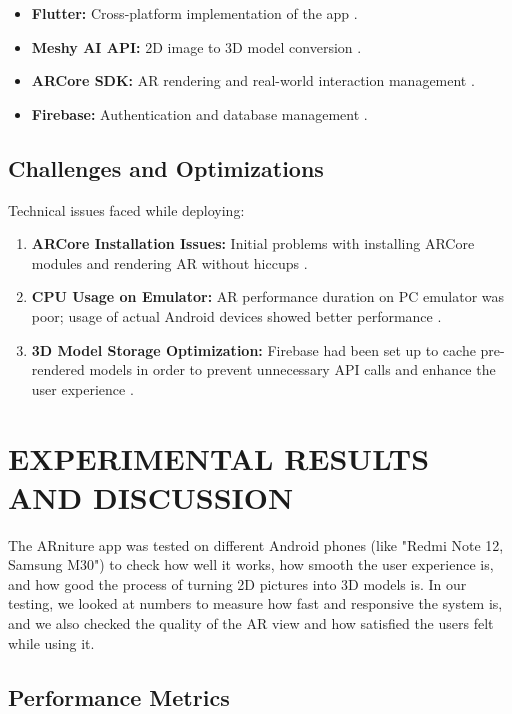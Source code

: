 \documentclass[12pt, a4paper]{article}
\begin{document}
\begin{itemize}
    \item \textbf{Flutter:} Cross-platform implementation of the app \cite{ref4}.
    \item \textbf{Meshy AI API:} 2D image to 3D model conversion \cite{ref2}.
    \item \textbf{ARCore SDK:} AR rendering and real-world interaction management \cite{ref3}.
    \item \textbf{Firebase:} Authentication and database management \cite{ref5}.
\end{itemize}

\subsection{Challenges and Optimizations}

Technical issues faced while deploying:
\begin{enumerate}
    \item \textbf{ARCore Installation Issues:} Initial problems with installing ARCore modules and rendering AR without hiccups \cite{ref6}.
    \item \textbf{CPU Usage on Emulator:} AR performance duration on PC emulator was poor; usage of actual Android devices showed better performance \cite{ref7}.
    \item \textbf{3D Model Storage Optimization:} Firebase had been set up to cache pre-rendered models in order to prevent unnecessary API calls and enhance the user experience \cite{ref8}.
\end{enumerate}

\section{EXPERIMENTAL RESULTS AND DISCUSSION}

The ARniture app was tested on different Android phones (like "Redmi Note 12, Samsung M30") to check how well it works, how smooth the user experience is, and how good the process of turning 2D pictures into 3D models is. In our testing, we looked at numbers to measure how fast and responsive the system is, and we also checked the quality of the AR view and how satisfied the users felt while using it.

\subsection{Performance Metrics}
\end{document}
